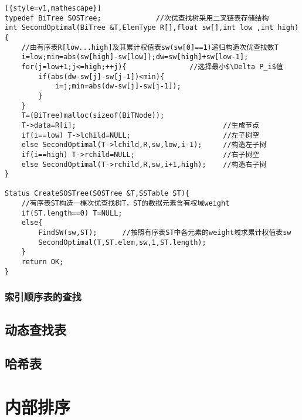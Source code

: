 \documentclass[UTF8]{ctexart}
\begin{document}
 



\begin{lstlisting}[{style=v1,mathescape}]
typedef BiTree SOSTree;             //次优查找树采用二叉链表存储结构
int SecondOptimal(BiTree &T,ElemType R[],float sw[],int low ,int high){
    //由有序表R[low...high]及其累计权值表sw(sw[0]==1)递归构造次优查找数T
    i=low;min=abs(sw[high]-sw[low]);dw=sw[high]+sw[low-1];
    for(j=low+1;j<=high;++j){               //选择最小$\Delta P_i$值
        if(abs(dw-sw[j]-sw[j-1])<min){
            i=j;min=abs(dw-sw[j]-sw[j-1]);
        }
    }
    T=(BiTree)malloc(sizeof(BiTNode));
    T->data=R[i];                                   //生成节点
    if(i==low) T->lchild=NULL;                      //左子树空
    else SecondOptimal(T->lchild,R,sw,low,i-1);     //构造左子树   
    if(i==high) T->rchild=NULL;                     //右子树空
    else SecondOptimal(T->rchild,R,sw,i+1,high);    //构造右子树    
}

Status CreateSOSTree(SOSTree &T,SSTable ST){
    //有序表ST构造一棵次优查找树T，ST的数据元素含有权域weight
    if(ST.length==0) T=NULL;
    else{
        FindSW(sw,ST);      //按照有序表ST中各元素的weight域求累计权值表sw
        SecondOptimal(T,ST.elem,sw,1,ST.length);
    }
    return OK;
}

\end{lstlisting}





\subsubsection{索引顺序表的查找}











\subsection{动态查找表}
\subsection{哈希表}





\newpage
\section{内部排序}
\end{document}
